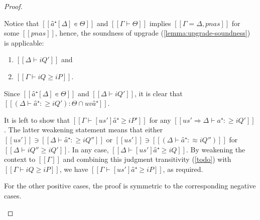 \begin{proof}
\begin{caseof}
    Notice that $[[â⁺[Δ] ∊ Θ]]$ and $[[Γ ⊢ Θ]]$ 
    implies $[[Γ = Δ, pnas]]$ for some $[[pnas]]$, hence, the
    soundness of upgrade (\cref{lemma:upgrade-soundness}) is applicable:
    \begin{enumerate}
        \item $[[Δ ⊢ iQ']]$ and
        \item $[[Γ ⊢ iQ ≥ iP]]$.
    \end{enumerate}

    Since $[[â⁺[Δ] ∊ Θ]]$ and $[[Δ ⊢ iQ']]$, it is clear that $[[(Δ ⊢ â⁺ :≥ iQ') : Θ ∩ uv â⁺ ]]$.

    It is left to show that $[[Γ ⊢ [us']â⁺ ≥ iP']]$ for any $[[us' ⇒ Δ ⊢ â⁺ :≥ iQ']]$.
    The latter weakening statement means that either $[[us']] \ni [[Δ ⊢ â⁺ :≥ iQ'']]$ or
    $[[us']] \ni [[(Δ ⊢ â⁺ :≈ iQ'')]]$ for $[[Δ ⊢ iQ'' ≥ iQ']]$. In any case,
    $[[Δ ⊢ [us']â⁺ ≥ iQ]]$. By weakening the context to $[[Γ]]$ and combining this judgment
    transitivity (\cref{todo}) with $[[Γ ⊢ iQ ≥ iP]]$, we have $[[Γ ⊢ [us']â⁺ ≥ iP]]$,
    as required. 

    \item For the other positive cases, the proof is symmetric to the corresponding negative cases.
    \end{caseof}
\end{proof}

